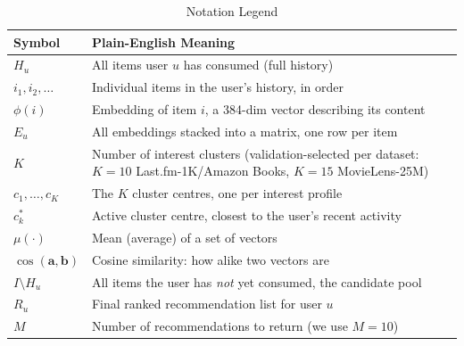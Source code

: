 \documentclass{article}
\begin{document}
\begin{table}[H]
\centering
\caption{Notation Legend}
\label{tab:notation}
\small
\begin{tabular}{ll}
\toprule
\textbf{Symbol} & \textbf{Plain-English Meaning} \\
\midrule
$H_u$ & All items user $u$ has consumed (full history) \\
$i_1, i_2, \ldots$ & Individual items in the user's history, in order \\
$\phi(i)$ & Embedding of item $i$, a 384-dim vector describing its content \\
$E_u$ & All embeddings stacked into a matrix, one row per item \\
$K$ & Number of interest clusters (validation-selected per dataset: $K=10$ Last.fm-1K/Amazon Books, $K=15$ MovieLens-25M) \\
$c_1, \ldots, c_K$ & The $K$ cluster centres, one per interest profile \\
$c_k^*$ & Active cluster centre, closest to the user's recent activity \\
$\mu(\cdot)$ & Mean (average) of a set of vectors \\
$\cos(\mathbf{a},\mathbf{b})$ & Cosine similarity: how alike two vectors are \\
$I \setminus H_u$ & All items the user has \emph{not} yet consumed, the candidate pool \\
$R_u$ & Final ranked recommendation list for user $u$ \\
$M$ & Number of recommendations to return (we use $M=10$) \\
\bottomrule
\end{tabular}
\end{table}
\end{document}
